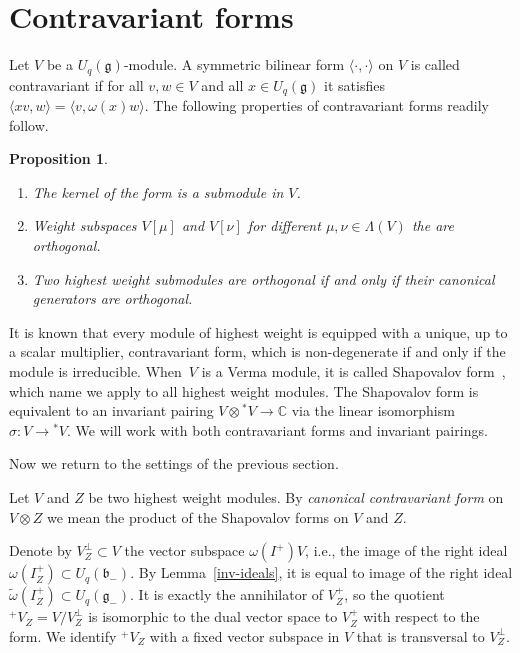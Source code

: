 \documentclass[pdftex]{sigma}
\numberwithin{equation}{section}
\newtheorem{Proposition}[Theorem]{Proposition}
 { \theoremstyle{definition}
\newtheorem{Definition}[Theorem]{Definition}
\newtheorem{Example}[Theorem]{Example}
\newtheorem{Remark}[Theorem]{Remark} }
\begin{document}
\section{Contravariant forms}
Let $V$ be a $U_q(\mathfrak{g})$-module. A symmetric bilinear form $\langle \cdot,\cdot\rangle$ on $V$ is called contravariant if for all $v,w\in V$ and all $x\in U_q(\mathfrak{g})$ it satisfies $\langle x v, w\rangle=\langle v,\omega(x)w\rangle$. The following properties of contravariant forms readily follow.
\begin{Proposition}\label{form_features} \quad
\begin{enumerate}\itemsep=0pt
 \item[$i)$] The kernel of the form is a submodule in $V$.
 \item[$ii)$] Weight subspaces $V[\mu]$ and $V[\nu]$ for different $\mu,\nu\in \Lambda(V)$ the are orthogonal.
 \item[$iii)$] Two highest weight submodules are orthogonal if and only if their canonical generators are orthogonal.
 \end{enumerate}
\end{Proposition}

 It is known that every module of highest weight is equipped with a unique, up to a scalar multiplier, contravariant form, which is non-degenerate if and only if the module is irreducible. When~$V$ is a Verma module, it is called Shapovalov form~\cite{Sh}, which name we apply to all highest weight modules. The Shapovalov form is equivalent to an invariant pairing $V\otimes {}^*\!V\to \mathbb{C}$ via the linear isomorphism $\sigma \colon V\to {}^*\!V$. We will work with both contravariant forms and invariant pairings.

Now we return to the settings of the previous section.
\begin{Definition} Let $V$ and $Z$ be two highest weight modules. By {\em canonical contravariant form} on $V\otimes Z$ we mean the product of the Shapovalov forms on $V$ and $Z$.
\end{Definition}

 Denote by $V^\perp_Z\subset V$ the vector subspace $\omega(I^+)V$, i.e., the image of the right ideal $\omega(I^+_Z)\subset U_q(\mathfrak{b}_-)$. By Lemma~\ref{inv-ideals}, it is equal to image of the right ideal $\tilde \omega (I^+_Z)\subset U_q(\mathfrak{g}_-)$. It is exactly the annihilator of $V^+_Z$, so the quotient ${}^+\!V_Z=V/V^\perp_Z$ is isomorphic to the dual vector space to $V^+_Z$ with respect to the form. We identify ${}^+\!V_Z$ with a fixed vector subspace in $V$ that is transversal to $V^\perp_Z$.
\end{document}
